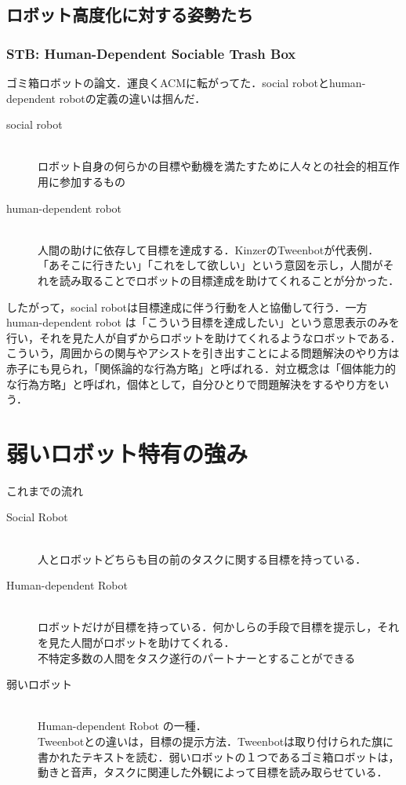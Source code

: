 \documentclass[fleqn,twocolumn]{mynote}
\begin{document}
\subsection*{ロボット高度化に対する姿勢たち}
\subsubsection*{STB: Human-Dependent Sociable Trash Box}
ゴミ箱ロボットの論文\cite{岡田美智男-2012-ゴミ箱ロ}．運良くACMに転がってた．social robotとhuman-dependent robotの定義の違いは掴んだ．

\begin{description}
  \item[social robot]\mbox{}\\
    ロボット自身の何らかの目標や動機を満たすために人々との社会的相互作用に参加するもの
  \item[human-dependent robot]\mbox{}\\
    人間の助けに依存して目標を達成する．KinzerのTweenbotが代表例．\\
    「あそこに行きたい」「これをして欲しい」という意図を示し，人間がそれを読み取ることでロボットの目標達成を助けてくれることが分かった．
\end{description}

したがって，social robotは目標達成に伴う行動を人と協働して行う．一方human-dependent robot は「こういう目標を達成したい」という意思表示のみを行い，それを見た人が自ずからロボットを助けてくれるようなロボットである\cite{Yamaji-2010-STBHumandependentSociableTrash}．こういう，周囲からの関与やアシストを引き出すことによる問題解決のやり方は赤子にも見られ，「関係論的な行為方略」と呼ばれる\cite{岡田美智男-2012-ゴミ箱ロ}．対立概念は「個体能力的な行為方略」と呼ばれ，個体として，自分ひとりで問題解決をするやり方をいう．

\section*{弱いロボット特有の強み}
これまでの流れ
\begin{description}
  \item[Social Robot]\mbox{}\\
    人とロボットどちらも目の前のタスクに関する目標を持っている\cite{Breazeal-2004-SocialInteractionsHRIRobot}．
  \item[Human-dependent Robot]\mbox{}\\
    ロボットだけが目標を持っている．何かしらの手段で目標を提示し，それを見た人間がロボットを助けてくれる．\\
    \Rightarrow 不特定多数の人間をタスク遂行のパートナーとすることができる\cite{--TweenbotsKacieKinzer}
  \item[弱いロボット]\mbox{}\\
    Human-dependent Robot の一種． \\
    Tweenbotとの違いは，目標の提示方法．Tweenbotは取り付けられた旗に書かれたテキストを読む．弱いロボットの１つであるゴミ箱ロボットは，動きと音声，タスクに関連した外観によって目標を読み取らせている．\\
\end{description}
\end{document}
